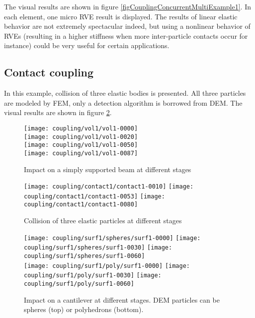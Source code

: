 The visual results are shown in figure \ref{figCouplingConcurrentMultiExample1}.
In each  element, one micro RVE result is displayed.
The results of linear elastic behavior are not extremely spectacular indeed, but using a nonlinear behavior of RVEs (resulting in a higher stiffness when more inter-particle contacts occur for instance) could be very useful for certain applications.

\subsection{Contact coupling}

In this example, collision of three elastic bodies is presented.
All three particles are modeled by FEM, only a detection algorithm is borrowed from DEM.
The visual results are shown in figure \ref{figCouplingConcurrentContactExample1}.

\begin{figure}[p]
	\centering
	\texttt{[image: coupling/vol1/vol1-0000]}
	\\
	\texttt{[image: coupling/vol1/vol1-0020]}
	\\
	\texttt{[image: coupling/vol1/vol1-0050]}
	\\
	\texttt{[image: coupling/vol1/vol1-0087]}
	\caption{Impact on a simply supported beam at different stages}
	\label{figCouplingConcurrentVolumeExample1}
\end{figure}

\begin{figure}[p]
	\centering
	\texttt{[image: coupling/contact1/contact1-0010]}
	\texttt{[image: coupling/contact1/contact1-0053]}
	\texttt{[image: coupling/contact1/contact1-0080]}
	\caption{Collision of three elastic particles at different stages}
	\label{figCouplingConcurrentContactExample1}
\end{figure}

\begin{figure}[p]
	\centering
	\texttt{[image: coupling/surf1/spheres/surf1-0000]}
	\texttt{[image: coupling/surf1/spheres/surf1-0030]}
	\texttt{[image: coupling/surf1/spheres/surf1-0060]}
	\\
	\texttt{[image: coupling/surf1/poly/surf1-0000]}
	\texttt{[image: coupling/surf1/poly/surf1-0030]}
	\texttt{[image: coupling/surf1/poly/surf1-0060]}
	\caption[Impact on a cantilever at different stages]{Impact on a cantilever at different stages. DEM particles can be spheres (top) or polyhedrons (bottom).}
	\label{figCouplingConcurrentSurfaceExample1}
\end{figure}

